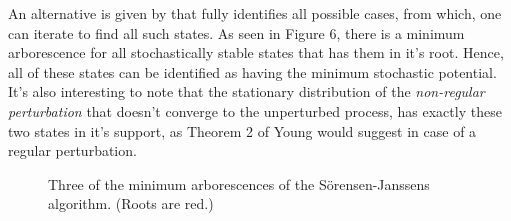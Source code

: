 \documentclass[11pt, a4paper, leqno]{article}
\begin{document}
An alternative is given by 
\citet{sorensen2005algorithm} that fully identifies all possible cases, 
from which, one can iterate to find all such states. As seen in Figure 6, 
there is a minimum arborescence for all stochastically stable states that 
has them in it's root. Hence, all of these states can be identified as having the 
minimum stochastic potential. It's also interesting to note that the 
stationary distribution of the \textit{non-regular perturbation} that doesn't
converge to the unperturbed process, has exactly these two states in it's support,
as Theorem 2 of Young would suggest in case of a regular perturbation.


\begin{figure}
    \centering
    \hfill  %
    \hfill  %
    
    \caption{Three of the minimum arborescences of the Sörensen-Janssens algorithm. (Roots are red.)}

\end{figure}


\newpage

\printbibliography
{}



\end{document}
